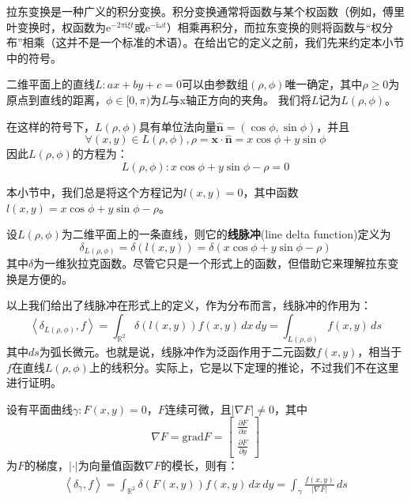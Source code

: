 拉东变换是一种广义的积分变换。积分变换通常将函数与某个权函数（例如，傅里叶变换时，权函数为$\mathrm{e}^{-2\pi \mathrm{i}\xi t}$或$\mathrm{e}^{-\mathrm{i}\omega t}$）相乘再积分，而拉东变换的则将函数与“权分布”相乘（这并不是一个标准的术语）。在给出它的定义之前，我们先来约定本小节中的符号。

\begin{definition}[二位平面上的直线系]
    二维平面上的直线$L:ax+by+c=0$可以由参数组$(\rho,\phi)$唯一确定，其中$\rho\geq 0$为原点到直线的距离，$\phi\in[0,\pi)$为$L$与x轴正方向的夹角。
    我们将$L$记为$L(\rho,\phi)$。
\end{definition}

在这样的符号下，$L(\rho,\phi)$具有单位法向量$\hat{\mathbf{n}}=(\cos\phi,\sin\phi)$，并且$$\forall (x,y)\in L(\rho,\phi),\rho=\mathbf{x}\cdot\hat{\mathbf{n}}=x\cos\phi+y\sin\phi$$
因此$L(\rho,\phi)$的方程为：
\[L(\rho,\phi): x\cos\phi+y\sin\phi-\rho=0\]

本小节中，我们总是将这个方程记为$l(x,y)=0$，其中函数$l(x,y)=x\cos\phi+y\sin\phi-\rho$。

\begin{definition}[线脉冲]
    设$L(\rho,\phi)$为二维平面上的一条直线，则它的\textbf{线脉冲}(line delta function)定义为
    \[\delta_{L(\rho,\phi)}=\delta(l(x,y))=\delta(x\cos\phi+y\sin\phi-\rho)\]
    其中$\delta$为一维狄拉克函数。尽管它只是一个形式上的函数，但借助它来理解拉东变换是方便的。
\end{definition}

以上我们给出了线脉冲在形式上的定义，作为分布而言，线脉冲的作用为：
\[\left\langle \delta_{L(\rho,\phi)},f\right\rangle=\int_{\mathbb{R}^2}\delta(l(x,y))f(x,y)\,dx\,dy=\int_{L(\rho,\phi)}f(x,y)\,ds\]
其中$ds$为弧长微元。也就是说，线脉冲作为泛函作用于二元函数$f(x,y)$，相当于$f$在直线$L(\rho,\phi)$上的线积分。实际上，它是以下定理的推论，不过我们不在这里进行证明。
\begin{claim}
    设有平面曲线$\gamma:F(x,y)=0$，$F$连续可微，且$|\nabla F|\neq 0$，其中
    \[\nabla F=\text{grad}F=\begin{bmatrix}
        \frac{\partial F}{\partial x}\\
        \frac{\partial F}{\partial y}        
    \end{bmatrix}\]
    为$F$的梯度，$|\cdot|$为向量值函数$\nabla F$的模长，则有：
    \begin{align*}
        \left\langle \delta_{\gamma},f\right\rangle=\int_{\mathbb{R}^2}\delta(F(x,y))f(x,y)\,dx\,dy=\int_{\gamma}\frac{f(x,y)}{|\nabla F|}\,ds
    \end{align*}
\end{claim}

